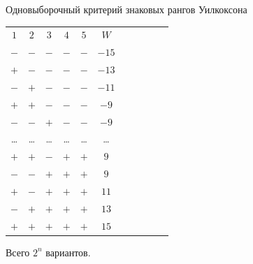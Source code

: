 \documentclass[11pt,pdf,utf8,hyperref={unicode},aspectratio=169]{beamer}
\begin{document}
\begin{frame}[label=signrank1]{\hyperlink{classification}{} Одновыборочный критерий знаковых рангов Уилкоксона}
{    \begin{center}  \setlength{\tabcolsep}{5pt}
        \begin{tabular}{c c c c c c c c c c c}
        $1$&$2$&$3$&$4$&$5$&$W$\\
        $-$&$-$&$-$&$-$&$-$&$-15$\\
        $+$&$-$&$-$&$-$&$-$&$-13$\\
        $-$&$+$&$-$&$-$&$-$&$-11$\\
        $+$&$+$&$-$&$-$&$-$&$-9$\\
        $-$&$-$&$+$&$-$&$-$&$-9$\\
        \dots&\dots&\dots&\dots&\dots&\dots\\
         $+$&$+$&$-$&$+$&$+$&$9$\\
        $-$&$-$&$+$&$+$&$+$&$9$\\
        $+$&$-$&$+$&$+$&$+$&$11$\\
        $-$&$+$&$+$&$+$&$+$&$13$\\
        $+$&$+$&$+$&$+$&$+$&$15$\\
        \end{tabular}
    \end{center}

    Всего $2^n$ вариантов.
 }
\end{frame}
\end{document}
